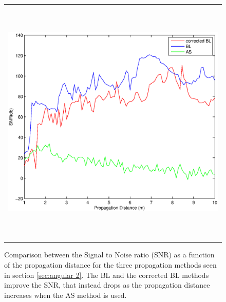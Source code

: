  \begin{figure}[h]
 	\begin{center}
 		\begin{tabular}{c}
 			\includegraphics[height=12cm]{SNR_com.eps}
 		\end{tabular}
 	\end{center}
 	\caption	{ \label{fig:SNR1} 
 		Comparison between the Signal to Noise ratio (SNR) as a function of the propagation distance for the three propagation methods seen in section \ref{sec:angular 2}. The BL and the corrected BL methods improve the SNR, that instead drops as the propagation distance increases when the AS method is used. }
 \end{figure} 
